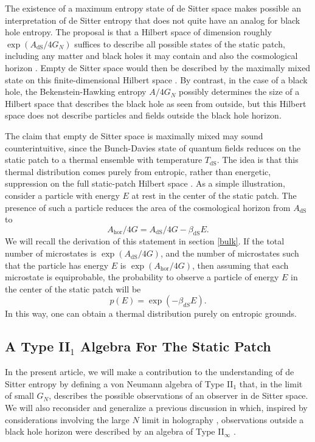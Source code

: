 \documentclass[11pt,a4paper]{article}
\def\be{\begin{equation}}
\def\ee{\end{equation}}
\def\dS{{\mathrm{dS}}}
\begin{document}
 The existence of  a maximum entropy state of de Sitter space makes possible an interpretation of de Sitter entropy that does not quite
 have an analog for black hole entropy.   The proposal is that a Hilbert space of dimension roughly $\exp(A_\dS/4G_N)$ suffices to describe all possible
 states of the static patch, including any matter and black holes it may contain and also the cosmological horizon \cite{BoussoOne,BoussoTwo,Banks,BanksFischler,BanksOne,BanksTwo,BFTwo,SusskindA,Susskind}. Empty de Sitter space would then be described by the maximally mixed state on this finite-dimensional Hilbert space \cite{DST, SusskindB}.
By contrast, in the case of  a black hole, the Bekenstein-Hawking entropy $A/4G_N$ possibly determines the size of a Hilbert space that describes the black hole as seen
 from outside, but this Hilbert space does not describe particles and fields outside the black hole horizon.

The claim that empty de Sitter space is maximally mixed may sound counterintuitive, since the Bunch-Davies state of quantum fields reduces on the static patch to a thermal ensemble with temperature $T_{\dS}$. The idea is that this thermal distribution comes purely from entropic, rather than energetic, suppression on the full static-patch Hilbert space \cite{BanksTwo, BanksOne,Susskind}. 
As a simple illustration, consider a particle with energy $E$ at rest in the center of the static patch. The presence of such a particle
reduces the  area of the cosmological horizon from $A_\dS$ to 
\be\label{horball}
A_{\mathrm{hor}}/4G = A_{\dS}/4G - \beta_{\dS} E. 
\ee
We will
recall the  derivation of this statement in section \ref{bulk}. If the total number of microstates is $\exp(A_\dS/4G)$, and 
the number of microstates such that the particle has energy $E$ is $\exp(A_{\mathrm{hor}}/4G)$, then assuming that 
each microstate is equiprobable,  the probability to observe a particle of energy $E$ in the center of the static patch will be 
\be\label{norball}
p(E) =  \exp(-\beta_{dS} E).\ee
In this way, one can obtain a thermal distribution purely on entropic grounds.
 
 \subsection{A Type II$_1$ Algebra For The Static Patch}
 
 In the present article, we will make a contribution to the understanding of de Sitter entropy by defining a von Neumann algebra of Type II$_1$
 that, in the limit of small $G_N$, describes the possible observations of an observer in de Sitter space.   We will also reconsider and generalize a previous
 discussion  in which, inspired by considerations involving the large $N$ limit
  in holography \cite{LL,LLtwo},  observations outside a black hole horizon were described by an algebra of Type II$_\infty$ \cite{GCP}.
  
\end{document}
